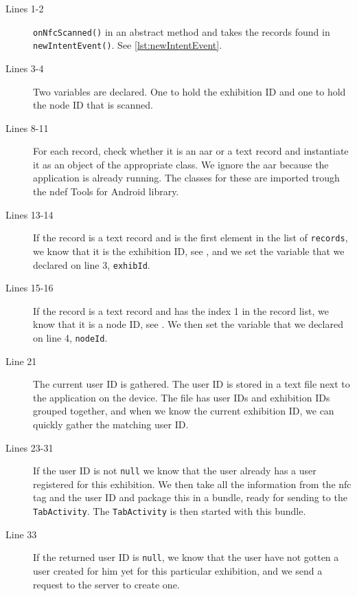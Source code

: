 \begin{description}
\item[Lines 1-2] \lstinline|onNfcScanned()| in an abstract method and takes the records found in \lstinline|newIntentEvent()|. See \autoref{lst:newIntentEvent}.
\item[Lines 3-4] Two variables are declared. One to hold the exhibition ID and one to hold the node ID that is scanned.
\item[Lines 8-11] For each record, check whether it is an \ac{aar} or a text record and instantiate it as an object of the appropriate class. We ignore the \ac{aar} because the application is already running. The classes for these are imported trough the \ac{ndef} Tools for Android \citep{ndeftools} library.
\item[Lines 13-14] If the record is a text record and is the first element in the list of \lstinline|records|, we know that it is the exhibition ID, see , and we set the variable that we declared on line 3, \lstinline|exhibId|.
\item[Lines 15-16] If the record is a text record and has the index 1 in the record list, we know that it is a node ID, see . We then set the variable that we declared on line 4, \lstinline|nodeId|.
\item[Line 21] The current user ID is gathered. The user ID is stored in a text file next to the application on the device. The file has user IDs and exhibition IDs grouped together, and when we know the current exhibition ID, we can quickly gather the matching user ID.
\item[Lines 23-31] If the user ID is not \lstinline|null| we know that the user already has a user registered for this exhibition. We then take all the information from the \ac{nfc} tag and the user ID and package this in a bundle, ready for sending to the \lstinline|TabActivity|. The \lstinline|TabActivity| is then started with this bundle.
\item[Line 33] If the returned user ID is \lstinline|null|, we know that the user have not gotten a user created for him yet for this particular exhibition, and we send a request to the server to create one.
\end{description}


